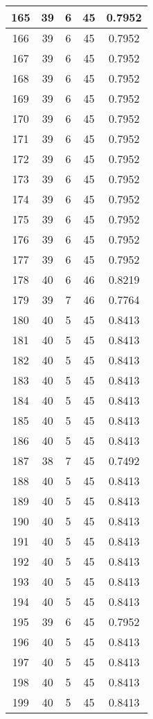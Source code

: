 \documentclass[letterpaper, 12pt]{article}
\begin{document}
\begin{longtable}{|c|c|c|c|c|}
\hline
165 & 39 & 6 & 45 & 0.7952 \\
\hline
166 & 39 & 6 & 45 & 0.7952 \\
\hline
167 & 39 & 6 & 45 & 0.7952 \\
\hline
168 & 39 & 6 & 45 & 0.7952 \\
\hline
169 & 39 & 6 & 45 & 0.7952 \\
\hline
170 & 39 & 6 & 45 & 0.7952 \\
\hline
171 & 39 & 6 & 45 & 0.7952 \\
\hline
172 & 39 & 6 & 45 & 0.7952 \\
\hline
173 & 39 & 6 & 45 & 0.7952 \\
\hline
174 & 39 & 6 & 45 & 0.7952 \\
\hline
175 & 39 & 6 & 45 & 0.7952 \\
\hline
176 & 39 & 6 & 45 & 0.7952 \\
\hline
177 & 39 & 6 & 45 & 0.7952 \\
\hline
178 & 40 & 6 & 46 & 0.8219 \\
\hline
179 & 39 & 7 & 46 & 0.7764 \\
\hline
180 & 40 & 5 & 45 & 0.8413 \\
\hline
181 & 40 & 5 & 45 & 0.8413 \\
\hline
182 & 40 & 5 & 45 & 0.8413 \\
\hline
183 & 40 & 5 & 45 & 0.8413 \\
\hline
184 & 40 & 5 & 45 & 0.8413 \\
\hline
185 & 40 & 5 & 45 & 0.8413 \\
\hline
186 & 40 & 5 & 45 & 0.8413 \\
\hline
187 & 38 & 7 & 45 & 0.7492 \\
\hline
188 & 40 & 5 & 45 & 0.8413 \\
\hline
189 & 40 & 5 & 45 & 0.8413 \\
\hline
190 & 40 & 5 & 45 & 0.8413 \\
\hline
191 & 40 & 5 & 45 & 0.8413 \\
\hline
192 & 40 & 5 & 45 & 0.8413 \\
\hline
193 & 40 & 5 & 45 & 0.8413 \\
\hline
194 & 40 & 5 & 45 & 0.8413 \\
\hline
195 & 39 & 6 & 45 & 0.7952 \\
\hline
196 & 40 & 5 & 45 & 0.8413 \\
\hline
197 & 40 & 5 & 45 & 0.8413 \\
\hline
198 & 40 & 5 & 45 & 0.8413 \\
\hline
199 & 40 & 5 & 45 & 0.8413 \\
\hline
\end{longtable}
\end{document}
